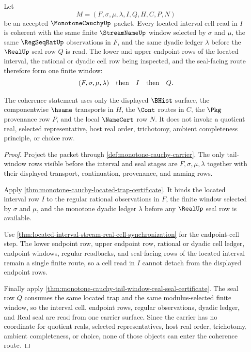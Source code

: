 \begin{theorem}
\label{thm:monotone-cauchy-located-interval-cell-coherence}
Let
$$
M=(F,\sigma,\mu,\lambda,I,Q,H,C,P,N)
$$
be an accepted $\MonotoneCauchyUp$ packet. Every located interval cell read in
$I$ is coherent with the same finite $\StreamNameUp$ window selected by
$\sigma$ and $\mu$, the same $\RegSeqRatUp$ observations in $F$, and the same
dyadic ledger $\lambda$ before the $\RealUp$ seal row $Q$ is read. The lower
and upper endpoint rows of the located interval, the rational or dyadic cell
row being inspected, and the seal-facing route therefore form one finite
window:
$$
(F,\sigma,\mu,\lambda)
\quad\hbox{then}\quad
I
\quad\hbox{then}\quad
Q .
$$

The coherence statement uses only the displayed $\BHist$ surface, the
componentwise $\hsame$ transports in $H$, the $\Cont$ routes in $C$, the
$\Pkg$ provenance row $P$, and the local $\NameCert$ row $N$. It does not
invoke a quotient real, selected representative, host real order, trichotomy,
ambient completeness principle, or choice row.
\end{theorem}
\begin{proof}
Project the packet through \autoref{def:monotone-cauchy-carrier}. The only
tail-window rows visible before the interval and seal stages are
$F,\sigma,\mu,\lambda$ together with their displayed transport, continuation,
provenance, and naming rows.

Apply \autoref{thm:monotone-cauchy-located-trap-certificate}. It binds the
located interval row $I$ to the regular rational observations in $F$, the
finite window selected by $\sigma$ and $\mu$, and the monotone dyadic ledger
$\lambda$ before any $\RealUp$ seal row is available.

Use \autoref{thm:located-interval-stream-real-cell-synchronization} for the
endpoint-cell step. The lower endpoint row, upper endpoint row, rational or
dyadic cell ledger, endpoint windows, regular readbacks, and seal-facing rows
of the located interval remain a single finite route, so a cell read in $I$
cannot detach from the displayed endpoint rows.

Finally apply
\autoref{thm:monotone-cauchy-tail-window-real-seal-certificate}. The seal row
$Q$ consumes the same located trap and the same modulus-selected finite window,
so the interval cell, endpoint rows, regular observations, dyadic ledger, and
Real seal are read from one carrier surface. Since the carrier has no
coordinate for quotient reals, selected representatives, host real order,
trichotomy, ambient completeness, or choice, none of those objects can enter
the coherence route.
\end{proof}

